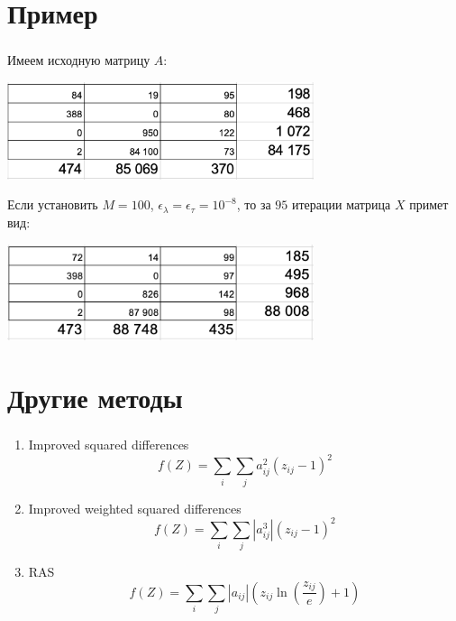 \documentclass{beamer}
\begin{document}
\section{Пример}
\begin{frame}
	\frametitle{\insertsection}
	
	Имеем исходную матрицу $A$:
	
	\includegraphics[width=9cm]{2019-12-06_22-20-14.png}
	
	Если установить $M = 100$, $\epsilon_\lambda = \epsilon_\tau = 10^{-8}$, то за $95$ итерации матрица $X$ примет вид:
	
	\includegraphics[width=9cm]{2019-12-07_12-15-01.png}
	
\end{frame}

\section{Другие методы}
\begin{frame}
	\frametitle{\insertsection}
	
	\begin{enumerate}
	    \item Improved squared differences
	    $$f(Z) = \sum_i \sum_j a_{ij}^2(z_{ij}-1)^2$$
	    \item Improved weighted squared differences
	    $$f(Z) = \sum_i \sum_j |a_{ij}^3|(z_{ij}-1)^2$$
	    \item RAS
	    $$f(Z) = \sum_i \sum_j |a_{ij}| \left(z_{ij} \ln \left( \frac{z_{ij}}{e} \right) + 1 \right)$$
	\end{enumerate}
	
\end{frame}
\end{document}
